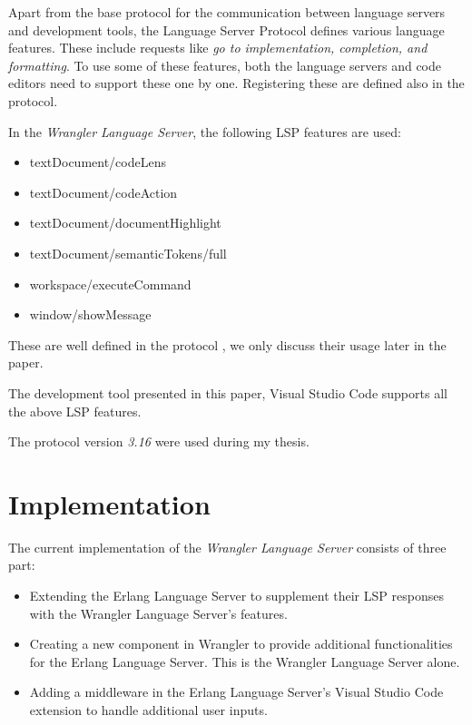 Apart from the base protocol for the communication between language servers and development tools, the Language Server Protocol defines various language features. These include requests like \textit{go to implementation, completion, and formatting}. To use some of these features, both the language servers and code editors need to support these one by one. Registering these are defined also in the protocol.\cite{LSP}

In the \emph{Wrangler Language Server}, the following LSP features are used:

\begin{itemize}
    \item textDocument/codeLens
    \item textDocument/codeAction
    \item textDocument/documentHighlight
    \item textDocument/semanticTokens/full
    \item workspace/executeCommand
    \item window/showMessage
\end{itemize}

These are well defined in the protocol \cite{LSP}, we only discuss their usage later in the paper.

\begin{note}
The development tool presented in this paper, Visual Studio Code supports all the above LSP features. 
\end{note}

The protocol version \emph{3.16} were used during my thesis.

\section{Implementation}

The current implementation of the \emph{Wrangler Language Server} consists of three part:

\begin{itemize}
    \item Extending the Erlang Language Server to supplement their LSP responses with the Wrangler Language Server's features.
    \item Creating a new component in Wrangler to provide additional functionalities for the Erlang Language Server. This is the Wrangler Language Server alone.
    \item Adding a middleware in the Erlang Language Server's Visual Studio Code extension to handle additional user inputs. 
\end{itemize}

